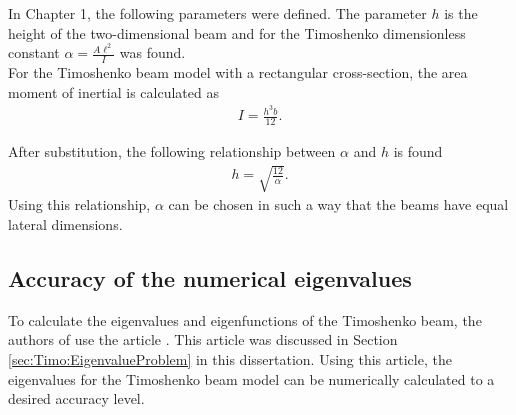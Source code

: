 \documentclass[../../main.tex]{subfiles}
\begin{document}
\begin{figure}[h!]
{{\begin{minipage}[b]{0.8\linewidth}
\begin{center}
				\end{center}
			\end{minipage}
		}
	}
\end{figure}

In Chapter 1, the following parameters were defined. The parameter $h$ is the height of the two-dimensional beam and for the Timoshenko dimensionless constant $\displaystyle \alpha = \frac{A \ell^2}{I}$ was found.\\

For the Timoshenko beam model with a rectangular cross-section, the area moment of inertial is calculated as
\begin{eqnarray*}
	I = \frac{h^3b}{12}.
\end{eqnarray*}

After substitution, the following relationship between $\alpha$ and $h$ is found
\begin{eqnarray*}
	h = \sqrt{\frac{12}{\alpha}}.
\end{eqnarray*}
Using this relationship, $\alpha$ can be chosen in such a way that the beams have equal lateral dimensions.


\subsection{Accuracy of the numerical eigenvalues}
To calculate the eigenvalues and eigenfunctions of the Timoshenko beam, the authors of \cite{LVV09} use the article \cite{VV06}. This article was discussed in Section \ref{sec:Timo:EigenvalueProblem} in this dissertation. Using this article, the eigenvalues for the Timoshenko beam model can be numerically calculated to a desired accuracy level. 
\end{document}
